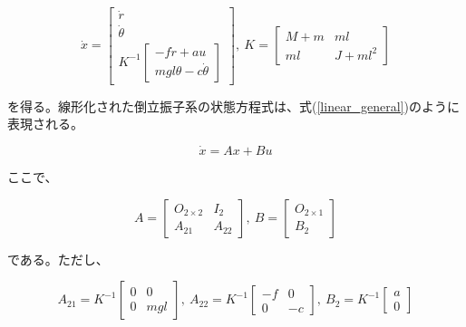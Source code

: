 \documentclass[a4j,11pt,twoside]{jbook}
\begin{document}
\begin{equation}
    \dot x = 
    \left[
        \begin{array}{c}
            \dot r \\
            \dot \theta \\
            K^{-1}
            \left[
                \begin{array}{c}
                    -f \dot r + au \\
                    mgl \theta - c \dot \theta
                \end{array}
            \right]
        \end{array}    
    \right],\
    K = 
    \left[
        \begin{array}{cc}
            M + m  &  ml \\
            ml     &  J + ml^2
        \end{array}
    \right]
\end{equation}

を得る。線形化された倒立振子系の状態方程式は、式(\ref{linear_general})のように表現される。

\begin{equation}
    \dot x = Ax + Bu
    \label{linear_general}
\end{equation}

ここで、

$$
    A = 
    \left[
        \begin{array}{cc}
            O_{2 \times 2}  &  I_{2} \\
            A_{21}          &  A_{22}
        \end{array}
    \right],\
    B = 
     \left[
        \begin{array}{c}
            O_{2 \times 1} \\
            B_{2}
        \end{array}
    \right]
$$

である。ただし、

$$
    A_{21} = K^{-1}
    \left[
        \begin{array}{cc}
            0  &  0 \\
            0  &  mgl
        \end{array}    
    \right],\
    A_{22} = K^{-1}
    \left[
        \begin{array}{cc}
            -f  &  0 \\
            0   &  -c
        \end{array}    
    \right],\
    B_{2} = K^{-1}
    \left[
        \begin{array}{c}
            a \\
            0
        \end{array}    
    \right]
$$
\end{document}

